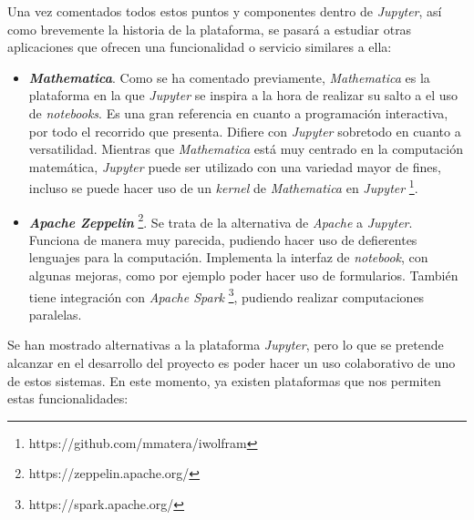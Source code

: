 \documentclass[11pt,spanish,listoffigures]{tfgetsinf}
\begin{document}
Una vez comentados todos estos puntos y componentes dentro de \textit{Jupyter}, así como brevemente la historia de la plataforma, se pasará a estudiar otras aplicaciones que ofrecen una funcionalidad o servicio similares a ella:

\begin{itemize}

\item \textbf{\textit{Mathematica}}. Como se ha comentado previamente, \textit{Mathematica} es la plataforma en la que \textit{Jupyter} se inspira a la hora de realizar su salto a el uso de \textit{notebooks}. Es una gran referencia en cuanto a programación interactiva, por todo el recorrido que presenta. Difiere con \textit{Jupyter} sobretodo en cuanto a versatilidad. Mientras que \textit{Mathematica} está muy centrado en la computación matemática, \textit{Jupyter} puede ser utilizado con una variedad mayor de fines, incluso se puede hacer uso de un \textit{kernel} de \textit{Mathematica} en \textit{Jupyter} \footnote{https://github.com/mmatera/iwolfram}.

\item \textbf{\textit{Apache Zeppelin}} \footnote{https://zeppelin.apache.org/}. Se trata de la alternativa de \textit{Apache} a \textit{Jupyter}. Funciona de manera muy parecida, pudiendo hacer uso de defierentes lenguajes para la computación. Implementa la interfaz de \textit{notebook}, con algunas mejoras, como por ejemplo poder hacer uso de formularios. También tiene integración con \textit{Apache Spark} \footnote{https://spark.apache.org/}, pudiendo realizar computaciones paralelas.

\end{itemize}

Se han mostrado alternativas a la plataforma \textit{Jupyter}, pero lo que se pretende alcanzar en el desarrollo del proyecto es poder hacer un uso colaborativo de uno de estos sistemas. En este momento, ya existen plataformas que nos permiten estas funcionalidades: 
\end{document}
